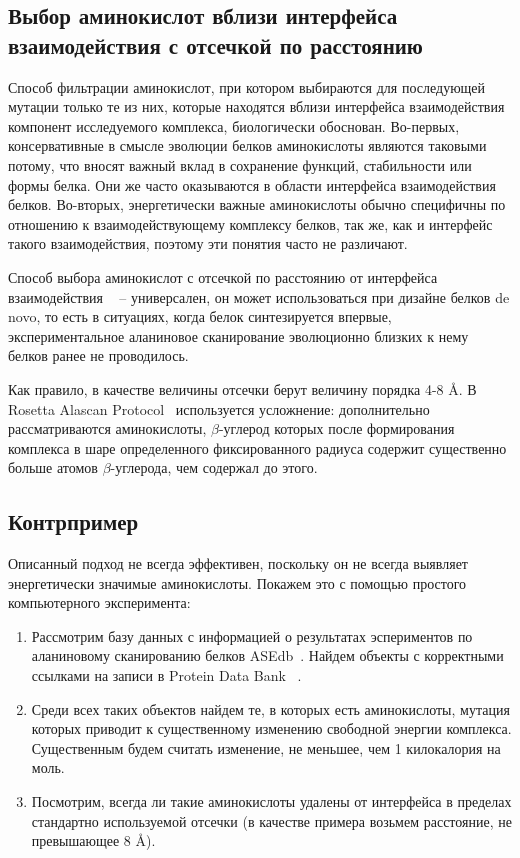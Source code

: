 \subsection{Выбор аминокислот вблизи интерфейса взаимодействия с отсечкой по расстоянию}

Способ фильтрации аминокислот, при котором выбираются для последующей мутации только те из них, которые находятся вблизи интерфейса взаимодействия компонент исследуемого комплекса, биологически обоснован. Во-первых,  консервативные в смысле эволюции белков аминокислоты являются таковыми потому, что вносят важный вклад в сохранение функций, стабильности или формы белка. Они же часто оказываются в области интерфейса взаимодействия белков. Во-вторых, энергетически важные аминокислоты обычно специфичны по отношению к взаимодействующему комплексу белков, так же, как и интерфейс такого взаимодействия, поэтому эти понятия часто не различают.

Способ выбора аминокислот с  отсечкой по расстоянию от интерфейса взаимодействия ~\cite{kortemme2004} -- универсален, он может использоваться при дизайне белков de novo, то есть в ситуациях, когда белок синтезируется впервые, экспериментальное аланиновое сканирование эволюционно близких к нему белков ранее не проводилось. 

Как правило, в качестве величины отсечки берут величину порядка  4-8 \AA{}. В  Rosetta Alascan Protocol~\cite{kortemme2004} используется усложнение: дополнительно рассматриваются аминокислоты, $\beta$-углерод которых после формирования комплекса в шаре определенного фиксированного радиуса содержит существенно больше атомов $\beta$-углерода, чем содержал до этого.
\subsection{Контрпример}
Описанный подход не всегда эффективен, поскольку он не всегда выявляет энергетически значимые аминокислоты. Покажем это с помощью простого компьютерного эксперимента:
\begin{enumerate}
\item Рассмотрим базу данных с информацией о результатах эспериментов по аланиновому сканированию белков ASEdb~\cite{asedb2001}. Найдем объекты с корректными ссылками на записи в Protein Data Bank ~\cite{rcsb}.
\item Среди всех таких объектов найдем те, в которых есть аминокислоты, мутация которых приводит к существенному изменению свободной энергии комплекса. Существенным будем считать изменение, не меньшее, чем 1 килокалория на моль.
\item Посмотрим, всегда ли такие аминокислоты удалены от интерфейса в пределах стандартно используемой отсечки (в качестве примера возьмем расстояние, не превышающее 8 \AA{}).
\end{enumerate}


